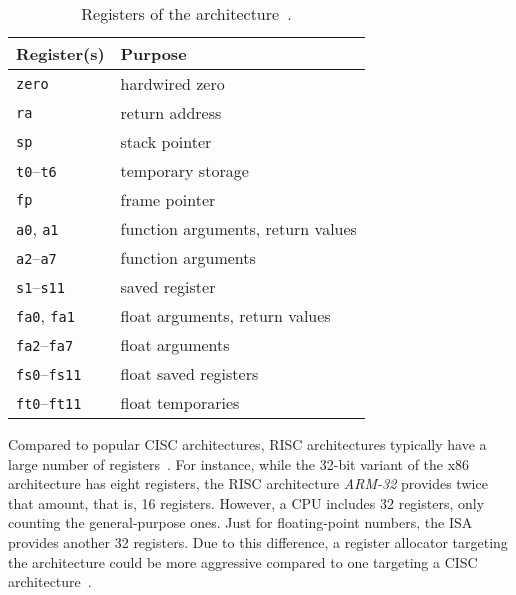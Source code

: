 \begin{wraptable}{o}{.4\textwidth}
	\centering
	\caption[Registers of the \riscv{} architecture.]{Registers of the \riscv{} architecture~\cite[p.~155]{Waterman2019}.}\label{tbl:riscv_regs}
	\begin{tabularx}{\linewidth}{l|L}
		 Register(s) & Purpose                           \\ \hline
		\texttt{zero}                  & hardwired zero                    \\ \hline
		\texttt{ra}                    & return address                    \\ \hline
		\texttt{sp}                    & stack pointer                     \\ \hline
		\texttt{t0}--\texttt{t6}       & temporary storage                 \\ \hline
		\texttt{fp}                    & frame pointer                     \\ \hline
		\texttt{a0}, \texttt{a1}       & function arguments, return values \\ \hline
		\texttt{a2}--\texttt{a7}       & function arguments                \\ \hline
		\texttt{s1}--\texttt{s11}      & saved register                    \\ \hline
		\texttt{fa0}, \texttt{fa1}     & float arguments, return values    \\ \hline
		\texttt{fa2}--\texttt{fa7}     & float arguments                   \\ \hline
		\texttt{fs0}--\texttt{fs11}    & float saved registers             \\ \hline
		\texttt{ft0}--\texttt{ft11}    & float temporaries                 \\
	\end{tabularx}
\end{wraptable}

Compared to popular CISC architectures, RISC architectures typically have a large number of registers~\cite[Chapter~2]{Dandamudi2005}.
For instance, while the 32-bit variant of the x86 architecture has eight registers,
the RISC architecture \emph{ARM-32} provides twice that amount, that is, 16 registers.
However, a \riscv{} CPU includes 32 registers, only counting the general-purpose ones.
Just for floating-point numbers, the ISA provides another 32 registers.
Due to this difference, a register allocator targeting the \riscv{} architecture could be more aggressive compared to one targeting a CISC architecture~\cite[p.~10]{Patterson2017}.


